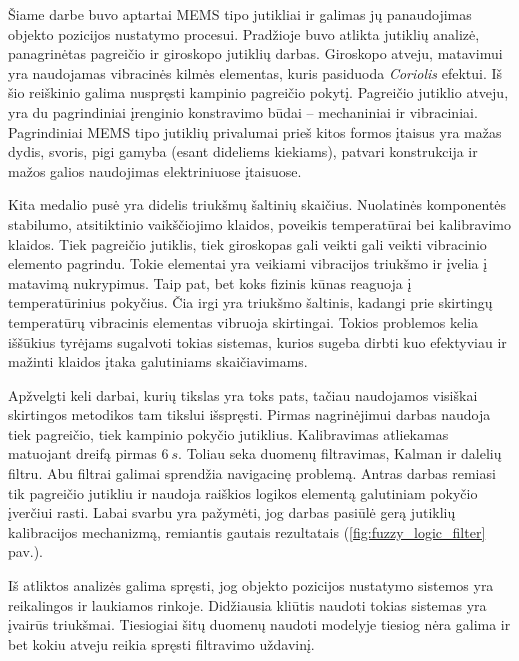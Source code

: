 Šiame darbe buvo aptartai MEMS tipo jutikliai ir galimas jų panaudojimas objekto pozicijos nustatymo procesui. Pradžioje buvo atlikta jutiklių analizė, panagrinėtas pagreičio ir giroskopo jutiklių darbas. Giroskopo atveju, matavimui yra naudojamas vibracinės kilmės elementas, kuris pasiduoda \textit{Coriolis} efektui. Iš šio reiškinio galima nuspręsti kampinio pagreičio pokytį. Pagreičio jutiklio atveju, yra du pagrindiniai įrenginio konstravimo būdai -- mechaniniai ir vibraciniai. Pagrindiniai MEMS tipo jutiklių privalumai prieš kitos formos įtaisus yra mažas dydis, svoris, pigi gamyba (esant dideliems kiekiams), patvari konstrukcija ir mažos galios naudojimas elektriniuose įtaisuose.

Kita medalio pusė yra didelis triukšmų šaltinių skaičius. Nuolatinės komponentės stabilumo, atsitiktinio vaikščiojimo klaidos, poveikis temperatūrai bei kalibravimo klaidos. Tiek pagreičio jutiklis, tiek giroskopas gali veikti gali veikti vibracinio elemento pagrindu. Tokie elementai yra veikiami vibracijos triukšmo ir įvelia į matavimą nukrypimus. Taip pat, bet koks fizinis kūnas reaguoja į temperatūrinius pokyčius. Čia irgi yra triukšmo šaltinis, kadangi prie skirtingų temperatūrų vibracinis elementas vibruoja skirtingai. Tokios problemos kelia iššūkius tyrėjams sugalvoti tokias sistemas, kurios sugeba dirbti kuo efektyviau ir mažinti klaidos įtaka galutiniams skaičiavimams.

Apžvelgti keli darbai, kurių tikslas yra toks pats, tačiau naudojamos visiškai skirtingos metodikos tam tikslui išspręsti. Pirmas nagrinėjimui darbas naudoja tiek pagreičio, tiek kampinio pokyčio jutiklius. Kalibravimas atliekamas matuojant dreifą pirmas $6~s$. Toliau seka duomenų filtravimas, Kalman ir dalelių filtru. Abu filtrai galimai sprendžia navigacinę problemą. Antras darbas remiasi tik pagreičio jutikliu ir naudoja raiškios logikos elementą galutiniam pokyčio įverčiui rasti. Labai svarbu yra pažymėti, jog darbas pasiūlė gerą jutiklių kalibracijos mechanizmą, remiantis gautais rezultatais (\ref{fig:fuzzy_logic_filter} pav.). 

Iš atliktos analizės galima spręsti, jog objekto pozicijos nustatymo sistemos yra reikalingos ir laukiamos rinkoje. Didžiausia kliūtis naudoti tokias sistemas yra įvairūs triukšmai. Tiesiogiai šitų duomenų naudoti modelyje tiesiog nėra galima ir bet kokiu atveju reikia spręsti filtravimo uždavinį.

